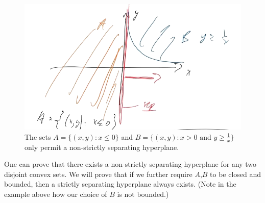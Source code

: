 \begin{figure}[ht]
  \centering
  \includegraphics[width=1\textwidth]{fig/lec12-non-strict-separator.png}
  \caption{The sets $A = \{ (x, y): x \leq 0\}$ and $B = \{ (x, y): x
    > 0 \text{ and } y \geq \frac{1}{x} \}$ only permit a non-strictly separating hyperplane.}
  \label{fig:lefthyper}
\end{figure}

One can prove that there exists a non-strictly separating hyperplane for any two disjoint convex sets.
We will prove that if we further require $A$,$B$ to be closed and
bounded, then a strictly separating hyperplane always exists. (Note in
the example above how our choice of $B$ is not bounded.)


